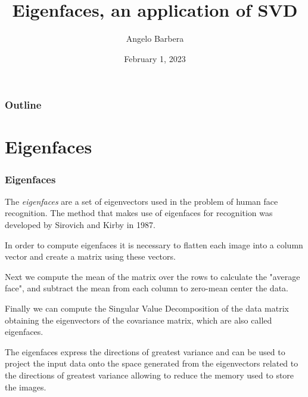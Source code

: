 \documentclass[10pt]{beamer}
\title{Eigenfaces, an application of SVD}
\author{Angelo Barbera}
\date{February 1, 2023}
\begin{document}
\begin{frame}
    \titlepage
\end{frame}


\begin{frame}
    \frametitle{Outline}
    \begin{multicols}{2}
      \tableofcontents
    \end{multicols}
    \end{frame}

\section{Eigenfaces}
\begin{frame}
    \frametitle{Eigenfaces}
    
    The \textit{eigenfaces} are a set of eigenvectors used in the problem of human face recognition. The method that makes use of
    eigenfaces for recognition was developed by Sirovich and Kirby in 1987. \vspace{4 pt}

    In order to compute eigenfaces it is necessary to flatten each image into a column vector and create a matrix using these vectors. \vspace{4 pt}
    
    Next we compute the mean of the matrix over the rows to calculate the "average face", and subtract the mean from each column to zero-mean center the data. \vspace{4 pt}
    
    Finally we can compute the Singular Value Decomposition of the data matrix obtaining the eigenvectors of the covariance matrix, which are also called eigenfaces. \vspace{4 pt}
    
    The eigenfaces express the directions of greatest variance and can be used to project the input data onto the space generated from the eigenvectors related to the directions of 
    greatest variance allowing to reduce the memory used to store the images.

\end{frame}
\end{document}
